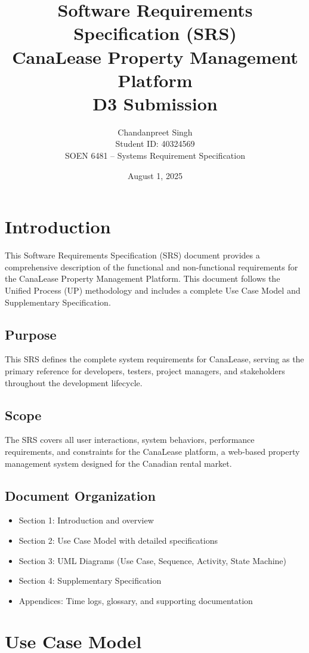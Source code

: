 \documentclass[12pt]{article}
\title{Software Requirements Specification (SRS)\\
\large CanaLease Property Management Platform\\
\small D3 Submission}
\author{Chandanpreet Singh \\ Student ID: 40324569 \\ SOEN 6481 -- Systems Requirement Specification}
\date{August 1, 2025}
\begin{document}
\maketitle
\tableofcontents
\newpage

\section{Introduction}

This Software Requirements Specification (SRS) document provides a comprehensive description of the functional and non-functional requirements for the CanaLease Property Management Platform. This document follows the Unified Process (UP) methodology and includes a complete Use Case Model and Supplementary Specification.

\subsection{Purpose}
This SRS defines the complete system requirements for CanaLease, serving as the primary reference for developers, testers, project managers, and stakeholders throughout the development lifecycle.

\subsection{Scope}
The SRS covers all user interactions, system behaviors, performance requirements, and constraints for the CanaLease platform, a web-based property management system designed for the Canadian rental market.

\subsection{Document Organization}
\begin{itemize}
    \item Section 1: Introduction and overview
    \item Section 2: Use Case Model with detailed specifications
    \item Section 3: UML Diagrams (Use Case, Sequence, Activity, State Machine)
    \item Section 4: Supplementary Specification
    \item Appendices: Time logs, glossary, and supporting documentation
\end{itemize}

\section{Use Case Model}
\end{document}
